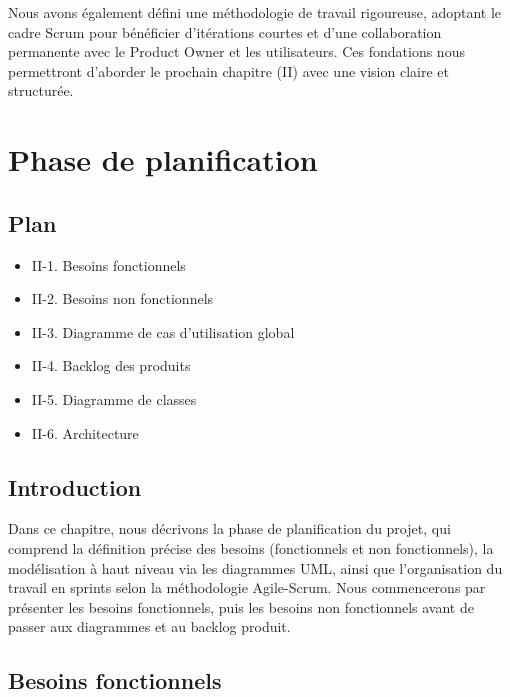 \documentclass[12pt,a4paper]{report}
\begin{document}
Nous avons également défini une méthodologie de travail rigoureuse, adoptant le cadre Scrum pour bénéficier d’itérations courtes et d’une collaboration permanente avec le Product Owner et les utilisateurs. Ces fondations nous permettront d’aborder le prochain chapitre (II) avec une vision claire et structurée.

\cleardoublepage
\chapter{Phase de planification}
\section*{Plan}
\begin{itemize}
  \item II-1. Besoins fonctionnels
  \item II-2. Besoins non fonctionnels
  \item II-3. Diagramme de cas d’utilisation global
  \item II-4. Backlog des produits
  \item II-5. Diagramme de classes
  \item II-6. Architecture
\end{itemize}

\section*{Introduction}
Dans ce chapitre, nous décrivons la phase de planification du projet, qui comprend la définition précise des besoins (fonctionnels et non fonctionnels), la modélisation à haut niveau via les diagrammes UML, ainsi que l’organisation du travail en sprints selon la méthodologie Agile-Scrum. Nous commencerons par présenter les besoins fonctionnels, puis les besoins non fonctionnels avant de passer aux diagrammes et au backlog produit.

\section{Besoins fonctionnels}
\end{document}
